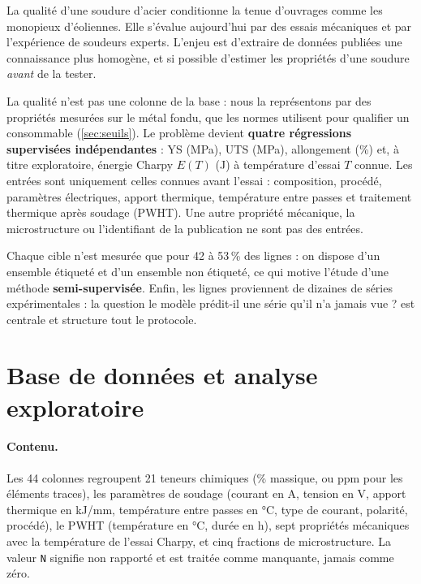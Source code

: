 \documentclass[11pt,a4paper]{article}
\begin{document}
La qualité d'une soudure d'acier conditionne la tenue d'ouvrages comme les
monopieux d'éoliennes. Elle s'évalue aujourd'hui par des essais mécaniques et
par l'expérience de soudeurs experts. L'enjeu est d'extraire de données publiées
une connaissance plus homogène, et si possible d'estimer les propriétés d'une
soudure \emph{avant} de la tester.

La \og qualité \fg{} n'est pas une colonne de la base : nous la représentons par
des propriétés mesurées sur le métal fondu, que les normes utilisent pour
qualifier un consommable (\cref{sec:seuils}). Le problème devient \textbf{quatre
régressions supervisées indépendantes} : YS (MPa), UTS (MPa), allongement (\%)
et, à titre exploratoire, énergie Charpy $E(T)$ (J) à température d'essai $T$
connue. Les entrées sont uniquement celles connues avant l'essai : composition,
procédé, paramètres électriques, apport thermique, température entre passes et
traitement thermique après soudage (PWHT). Une autre propriété mécanique, la
microstructure ou l'identifiant de la publication ne sont pas des entrées.

Chaque cible n'est mesurée que pour 42 à 53\,\% des lignes : on dispose d'un
ensemble étiqueté et d'un ensemble non étiqueté, ce qui motive l'étude d'une
méthode \textbf{semi-supervisée}. Enfin, les lignes proviennent de dizaines de
séries expérimentales : la question \og le modèle prédit-il une série qu'il n'a
jamais vue ? \fg{} est centrale et structure tout le protocole.

\section{Base de données et analyse exploratoire}
\label{sec:eda}

\paragraph{Contenu.} Les 44 colonnes regroupent 21 teneurs chimiques (\% massique,
ou ppm pour les éléments traces), les paramètres de soudage (courant en A, tension
en V, apport thermique en kJ/mm, température entre passes en °C, type de courant,
polarité, procédé), le PWHT
(température en °C, durée en h), sept propriétés mécaniques avec la température
de l'essai Charpy, et cinq fractions de microstructure. La valeur \texttt{N} signifie \og non rapporté \fg{} et est
traitée comme manquante, jamais comme zéro.
\end{document}
